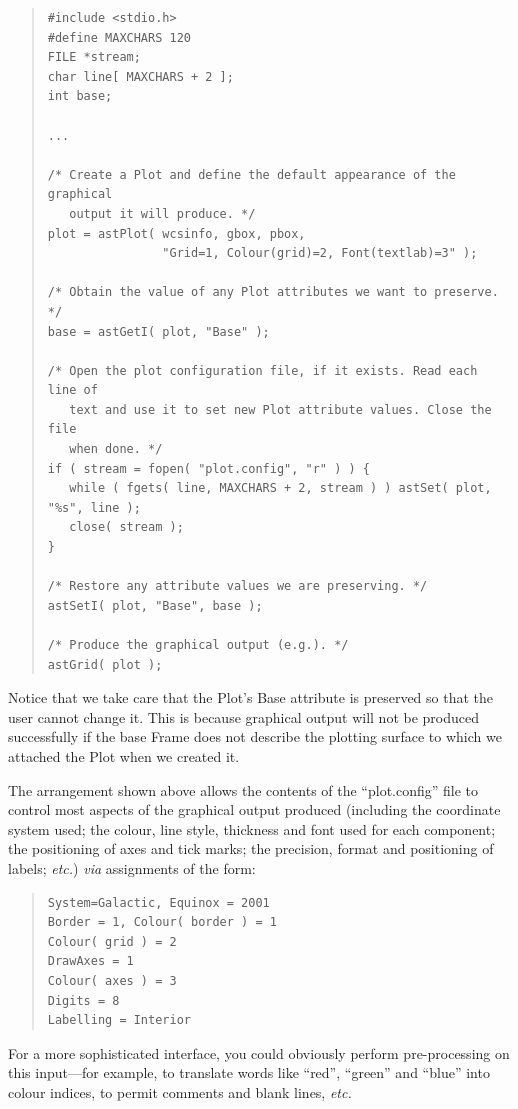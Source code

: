 \documentclass[twoside,11pt]{article}
\newcommand{\htmlref}[2]{#1}
\begin{document}
\begin{quote}
\small
\begin{verbatim}
#include <stdio.h>
#define MAXCHARS 120
FILE *stream;
char line[ MAXCHARS + 2 ];
int base;

...

/* Create a Plot and define the default appearance of the graphical
   output it will produce. */
plot = astPlot( wcsinfo, gbox, pbox,
                "Grid=1, Colour(grid)=2, Font(textlab)=3" );

/* Obtain the value of any Plot attributes we want to preserve. */
base = astGetI( plot, "Base" );

/* Open the plot configuration file, if it exists. Read each line of
   text and use it to set new Plot attribute values. Close the file
   when done. */
if ( stream = fopen( "plot.config", "r" ) ) {
   while ( fgets( line, MAXCHARS + 2, stream ) ) astSet( plot, "%s", line );
   close( stream );
}

/* Restore any attribute values we are preserving. */
astSetI( plot, "Base", base );

/* Produce the graphical output (e.g.). */
astGrid( plot );
\end{verbatim}
\normalsize
\end{quote}

Notice that we take care that the Plot's \htmlref{Base}{Base} attribute is preserved
so that the user cannot change it. This is because graphical output
will not be produced successfully if the base \htmlref{Frame}{Frame} does not describe
the plotting surface to which we attached the Plot when we created it.

The arrangement shown above allows the contents of the ``plot.config''
file to control most aspects of the graphical output produced
(including the coordinate system used; the colour, line style,
thickness and font used for each component; the positioning of axes
and tick marks; the precision, format and positioning of labels;
{\em{etc.}}) {\em{via}} assignments of the form:

\begin{quote}
\small
\begin{verbatim}
System=Galactic, Equinox = 2001
Border = 1, Colour( border ) = 1
Colour( grid ) = 2
DrawAxes = 1
Colour( axes ) = 3
Digits = 8
Labelling = Interior
\end{verbatim}
\normalsize
\end{quote}

For a more sophisticated interface, you could obviously perform
pre-processing on this input---for example, to translate words like
``red'', ``green'' and ``blue'' into colour indices, to permit
comments and blank lines, {\em{etc.}}
\end{document}
